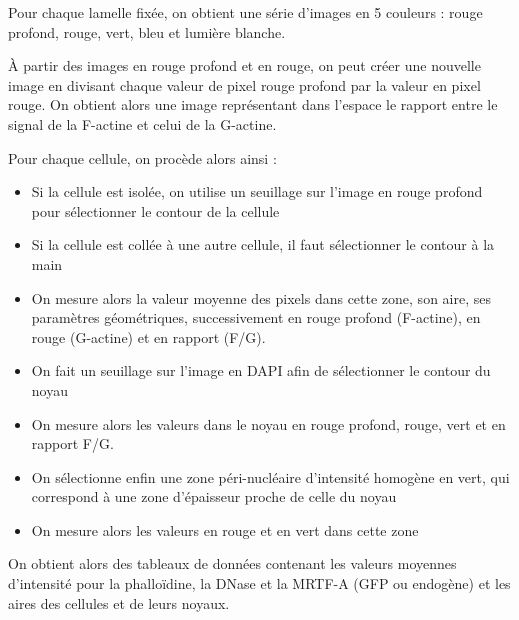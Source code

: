 	Pour chaque lamelle fixée, on obtient une série d'images en 5 couleurs : rouge profond, rouge, vert, bleu et lumière blanche. 

À partir des images en rouge profond et en rouge, on peut créer une nouvelle image en divisant chaque valeur de pixel rouge profond par la valeur en pixel rouge. On obtient alors une image représentant dans l'espace le rapport entre le signal de la F-actine et celui de la G-actine.

Pour chaque cellule, on procède alors ainsi : 
\begin{itemize}
\item Si la cellule est isolée, on utilise un seuillage sur l'image en rouge profond pour sélectionner le contour de la cellule
\item Si la cellule est collée à une autre cellule, il faut sélectionner le contour à la main
\item On mesure alors la valeur moyenne des pixels dans cette zone, son aire, ses paramètres géométriques, 
successivement en rouge profond (F-actine), en rouge (G-actine) et en rapport (F/G). 
\item On fait un seuillage sur l'image en DAPI afin de sélectionner le contour du noyau
\item On mesure alors les valeurs dans le noyau en rouge profond, rouge, vert et en rapport F/G. 
\item On sélectionne enfin une zone péri-nucléaire d'intensité homogène en vert, qui correspond à une zone d'épaisseur proche de celle du noyau
\item On mesure alors les valeurs en rouge et en vert dans cette zone
\end{itemize}	
	
	On obtient alors des tableaux de données contenant les valeurs moyennes d'intensité pour la phalloïdine, la DNase et la MRTF-A (GFP ou endogène) et les aires des cellules et de leurs noyaux. 
	
	
%
